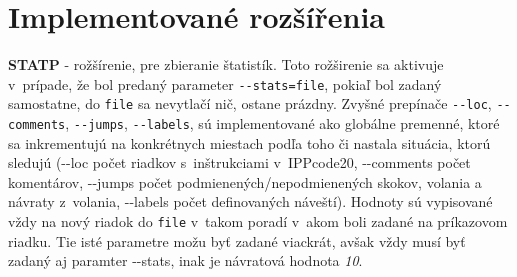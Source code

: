 \documentclass[11pt, a4paper]{article}
\begin{document}
	\section{Implementované rozšířenia}
	\textbf{STATP} - rožšírenie, pre zbieranie štatistík.
	Toto rožširenie sa aktivuje v~prípade, že bol predaný parameter \texttt{-{}-stats=file}, pokiaľ bol zadaný samostatne, do \texttt{file} sa nevytlačí nič, ostane prázdny. Zvyšné prepínače \texttt{-{}-loc}, \texttt{-{}-comments}, \texttt{-{}-jumps}, \texttt{-{}-labels}, sú implementované ako globálne premenné, ktoré sa inkrementujú na konkrétnych miestach podľa toho či nastala situácia, ktorú sledujú (-{}-loc počet riadkov s~inštrukciami v~IPPcode20, -{}-comments počet komentárov, -{}-jumps počet podmienených/nepodmienených skokov, volania a návraty z~volania, -{}-labels počet definovaných náveští). Hodnoty sú vypisované vždy na nový riadok do \texttt{file} v~takom poradí v~akom boli zadané na príkazovom riadku. Tie isté parametre možu byť zadané viackrát, avšak vždy musí byť zadaný aj paramter -{}-stats, inak je návratová hodnota \emph{10}. 
     
    
\end{document}

